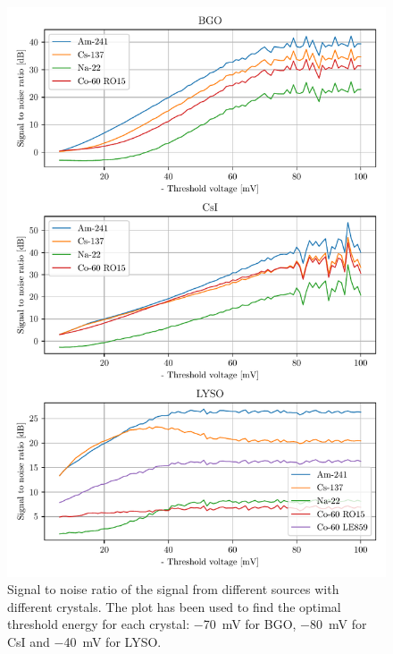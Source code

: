 \documentclass[a4paper, 11pt, table]{article}
\begin{document}
\begin{figure}[H]
    \centering
    \includegraphics[height=0.88\textheight]{figures/snr.pdf}
    \caption{Signal to noise ratio of the signal from different sources with different crystals. The plot has been used to find the optimal threshold energy for each crystal: \SI{-70}{mV} for BGO, \SI{-80}{mV} for CsI and \SI{-40}{mV} for LYSO.}
    \label{fig:snr}
\end{figure}
\end{document}
